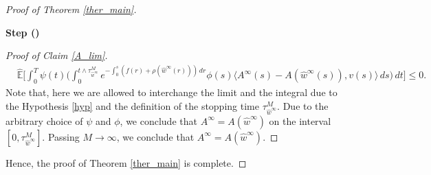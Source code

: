 \documentclass[english,a4paper,11pt]{amsart}
\theoremstyle{plain}
\theoremstyle{definition}
\theoremstyle{remark}
\numberwithin{equation}{section}
\newcounter{lil1}
\newenvironment{step}
{\begin{list} { \bf Step (\Roman{lil1})}
		{ \usecounter{lil1}
			\setlength{\leftmargin}{0.0cm}
			\setlength{\topsep}{0.2cm}
			\setlength{\itemsep}{0.0cm}
			\setlength{\parsep}{0.1cm}
			\setlength{\itemindent}{0.8cm}
			\setlength{\parskip}{0.0cm}}}
	{\end{list}}
\newcounter{lil33}
\newcounter{lil1q}
\newcommand{\wh}{\widehat}
\newcommand{\la}{\langle}
\newcommand{\ra}{\rangle}
\newcommand{\EE}{ \mathbb{E} }
\begin{document}
\begin{proof}[Proof of Theorem \ref{ther_main}]
\begin{step}
\begin{proof}[Proof of Claim \ref{A_lim}]
\begin{align}\label{MM05}
	\nonumber
	&\wh{\EE}\bigg[\int_0^T \psi(t)\bigg(\int_0^{t\wedge \tau_{\wh{w}^\infty}^M}e^{-\int_0^s(f(r)+\rho(\wh{w}^\infty(r)))\, dr} \phi(s)\la A^\infty(s)-A(\wh{w}^\infty(s)),v(s)\ra \,ds\bigg)\,dt\bigg]\leq 0.
\end{align}Note that, here we are allowed to interchange the limit and the integral due to the Hypothesis \ref{hyp} and the definition of the stopping time $\tau_{\wh{w}^\infty}^M$. Due to the arbitrary choice of $\psi$ and $\phi$, we conclude that $A^\infty=A(\wh{w}^\infty)$ on the interval $[0,\tau_{\wh{w}^\infty}^M]$. Passing $M\to\infty$, we conclude that $A^\infty=A(\wh{w}^\infty)$.
\end{proof}
\end{step}
Hence, the proof of Theorem \ref{ther_main} is complete.
\end{proof}
\end{document}

